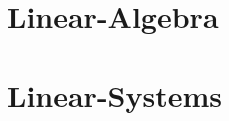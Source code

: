 \documentclass{beamer}
\begin{document}
\newcommand{\oneRowOps}[4] {
      #1 & #2 & #3 & #4 \\
}

\newcommand{\stopRowOps}{
    \end{array}
  \right]
}


\newcommand{\vecThree}[3]{
  \left[
  \begin{array}{r}
    #1 \\  #2 \\ #3
  \end{array}
  \right]
}


\newcommand{\stateThree}[3]{
  \begin{array}{r}
    \mbox{\fontsize{6}{6}\selectfont $#1$} \\  
    \mbox{\fontsize{6}{6}\selectfont $#2$} \\ 
    \mbox{\fontsize{6}{6}\selectfont $#3$}
  \end{array}
}





\newcommand{\detTwo}[4]{
  \left|
  \begin{array}{rr}
    #1 & #2 \\
    #3 & #4
  \end{array}
  \right|
}



\newcommand{\detThree}[9]{
  \left|
    \begin{array}{rrr}
      #1 & #2 & #3 \\
      #4 & #5 & #6 \\
      #7 & #8 & #9
    \end{array}
  \right|
}




\newcommand{\startRowFour}{
  \left[
    \begin{array}{rrrr}
}

\newcommand{\oneRowFour}[4] {
      #1 & #2 & #3 & #4 \\
}




\part{Linear-Algebra}



\part{Linear-Systems}
\end{document}
